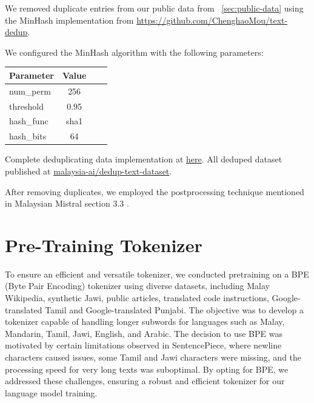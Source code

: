 \documentclass[preprint]{article}
\begin{document}
We removed duplicate entries from our public data from ~\ref{sec:public-data} using the MinHash implementation from \url{https://github.com/ChenghaoMou/text-dedup}.

We configured the MinHash algorithm with the following parameters:

\begin{table}[h]
  \centering
  \begin{tabular}{lccl}
    \hline
    \textbf{Parameter} & \textbf{Value} \\
    \hline
    num\_perm          & 256            \\
    threshold          & 0.95           \\
    hash\_func         & sha1           \\
    hash\_bits         & 64             \\
    \hline
  \end{tabular}
\end{table}

Complete deduplicating data implementation at \href{https://github.com/malaysia-ai/dedup-text-dataset?tab=readme-ov-file#text-dedup}{here}. All deduped dataset published at \href{https://huggingface.co/datasets/malaysia-ai/dedup-text-dataset}{malaysia-ai/dedup-text-dataset}.

After removing duplicates, we employed the postprocessing technique mentioned in Malaysian Mistral section 3.3 \cite{zolkepli2024large}.

\section{Pre-Training Tokenizer}

To ensure an efficient and versatile tokenizer, we conducted pretraining on a BPE (Byte Pair Encoding) tokenizer using diverse datasets, including Malay Wikipedia, synthetic Jawi, public articles, translated code instructions, Google-translated Tamil and Google-translated Punjabi. The objective was to develop a tokenizer capable of handling longer subwords for languages such as Malay, Mandarin, Tamil, Jawi, English, and Arabic. The decision to use BPE was motivated by certain limitations observed in SentencePiece, where newline characters caused issues, some Tamil and Jawi characters were missing, and the processing speed for very long texts was suboptimal. By opting for BPE, we addressed these challenges, ensuring a robust and efficient tokenizer for our language model training.
\end{document}
